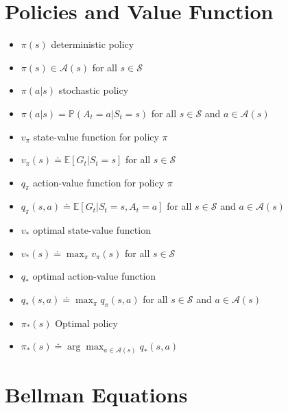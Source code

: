 \documentclass[10pt]{amsart}
\begin{document}
\newpage

\section*{Policies and Value Function}
\begin{itemize}
\item[] $\pi(s)$ \tabto{2cm} deterministic policy 
\item[] \tabto{2.5cm} $\pi(s) \in \mathcal{A}(s)$ for all $s \in \mathcal{S}$ 
\item[] $\pi(a|s)$ \tabto{2cm} stochastic policy 
\item[] \tabto{2.5cm}  $\pi(a|s) = \mathbb{P}(A_t=a|S_t=s)$ for all $s \in \mathcal{S}$ and $a \in \mathcal{A}(s)$
\item[] $v_\pi$ \tabto{2cm} state-value function for policy $\pi$ 
\item[] \tabto{2.5cm}  $v_\pi(s) \doteq \mathbb{E}[G_t|S_t=s]$ for all $s\in\mathcal{S}$
\item[] $q_\pi$ \tabto{2cm} action-value function for policy $\pi$
\item[] \tabto{2.5cm}  $q_\pi(s,a) \doteq \mathbb{E}[G_t|S_t=s, A_t=a]$ for all $s \in \mathcal{S}$ and $a \in \mathcal{A}(s)$
\item[] $v_*$ \tabto{2cm} optimal state-value function 
\item[] \tabto{2.5cm}  $v_*(s) \doteq \max_\pi v_\pi(s)$ for all $s \in \mathcal{S}$

\item[] $q_*$ \tabto{2cm} optimal action-value function 
\item[] \tabto{2.5cm}  $q_*(s,a) \doteq \max_\pi q_\pi(s,a)$ for all $s \in \mathcal{S}$ and $a \in \mathcal{A}(s)$

\item[] $\pi_*(s)$ \tabto{2cm} Optimal policy 
\item[] \tabto{2.5cm}  $\pi_*(s) \doteq \arg\max_{a\in\mathcal{A}(s)} q_*(s,a)$ 

\end{itemize}

\vspace{.5in}

\section*{Bellman Equations}
\end{document}
